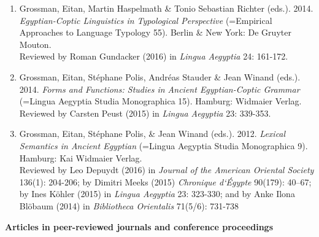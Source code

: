 \documentclass[letterpaper,11pt]{article}
\newcommand{\resheading}[1]{
\vspace*{6pt}
{\large \colorbox{mygrey}{\begin{minipage}{\textwidth}{\textbf{#1 \vphantom{p\^{E}}}}\end{minipage}}}
}
\begin{document}
\begin{enumerate}
\item {Grossman, Eitan, Martin Haspelmath \& Tonio Sebastian Richter (eds.).} {2014.} \textit{Egyptian-Coptic Linguistics in Typological Perspective} (=Empirical Approaches to Language Typology 55).  Berlin \& New York: De Gruyter Mouton.\\
\footnotesize{Reviewed by Roman Gundacker (2016) in \textit{Lingua Aegyptia} 24: 161-172.}
\normalsize
\item {Grossman, Eitan, St\'ephane Polis, Andr\'eas Stauder \& Jean Winand (eds.).} {2014.} \textit{Forms and Functions: Studies in Ancient Egyptian-Coptic Grammar} (=Lingua Aegyptia Studia Monographica 15). Hamburg: Widmaier Verlag.\\
\footnotesize{Reviewed by Carsten Peust (2015) in \textit{Lingua Aegyptia} 23: 339-353.}
\normalsize
\item {Grossman, Eitan, St\'ephane Polis, \& Jean Winand (eds.).} {2012.} \textit{Lexical Semantics in Ancient Egyptian} (=Lingua Aegyptia Studia Monographica 9). Hamburg: Kai Widmaier Verlag.\\
\footnotesize{{Reviewed by Leo Depuydt (2016) in \textit{Journal of the American Oriental Society} 136(1): 204-206; by Dimitri Meeks (2015) \textit{Chronique d`\'Egypte} 90(179): 40–67; by Ines K\"ohler (2015) in \textit{Lingua Aegyptia} 23: 323-330; and by Anke Ilona Bl\"obaum (2014) in \textit{Bibliotheca Orientalis} 71(5/6): 731-738}} 
\normalsize

\end{enumerate}
\resheading{Articles in peer-reviewed journals and conference proceedings}
\end{document}
